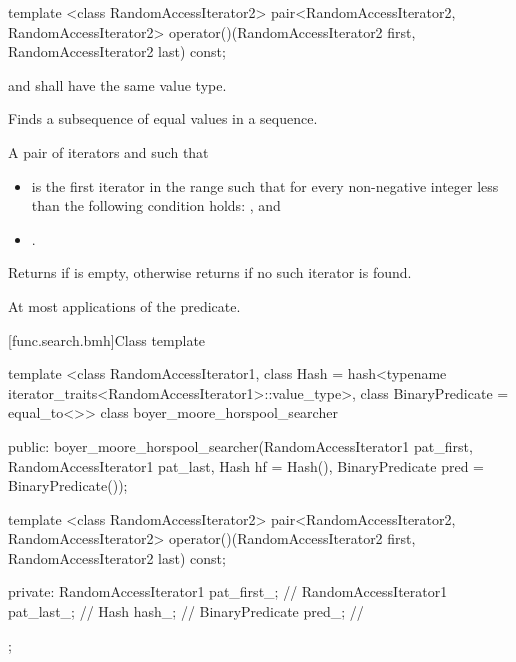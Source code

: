 %
\begin{itemdecl}
template <class RandomAccessIterator2>
  pair<RandomAccessIterator2, RandomAccessIterator2>
    operator()(RandomAccessIterator2 first, RandomAccessIterator2 last) const;
\end{itemdecl}

\begin{itemdescr}
\pnum
\requires
{} and  shall have the same value type.

\pnum
\effects
Finds a subsequence of equal values in a sequence.

\pnum
\returns
A pair of iterators  and  such that
\begin{itemize}
\item {} is the first iterator
in the range  such that
for every non-negative integer  less than 
the following condition holds:
, and
\item {}.
\end{itemize}
Returns  if  is empty,
otherwise returns  if no such iterator is found.

\pnum
\complexity
At most  applications of the predicate.
\end{itemdescr}

[func.search.bmh]{Class template }

%
\begin{codeblock}
template <class RandomAccessIterator1,
          class Hash = hash<typename iterator_traits<RandomAccessIterator1>::value_type>,
          class BinaryPredicate = equal_to<>>
  class boyer_moore_horspool_searcher {
  public:
    boyer_moore_horspool_searcher(RandomAccessIterator1 pat_first,
                                  RandomAccessIterator1 pat_last,
                                  Hash hf = Hash(),
                                  BinaryPredicate pred = BinaryPredicate());

    template <class RandomAccessIterator2>
      pair<RandomAccessIterator2, RandomAccessIterator2>
        operator()(RandomAccessIterator2 first, RandomAccessIterator2 last) const;

  private:
    RandomAccessIterator1 pat_first_;   // \expos
    RandomAccessIterator1 pat_last_;    // \expos
    Hash hash_;                         // \expos
    BinaryPredicate pred_;              // \expos
  };
\end{codeblock}

